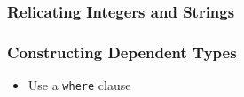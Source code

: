 \begin{frame}

\frametitle{Relicating Integers and Strings}


\end{frame}

\begin{frame}

\frametitle{Constructing Dependent Types}



\begin{itemize}

\item Use a \lstinline{where} clause

\end{itemize}

\end{frame}
